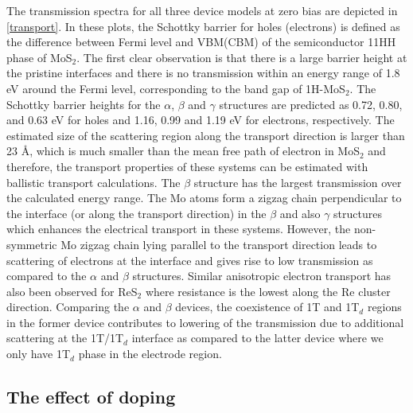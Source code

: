 The transmission spectra for all three  device models at zero bias are depicted in \autoref{transport}. In these plots, the Schottky barrier for holes (electrons) is defined as the difference between Fermi level and VBM(CBM) of the semiconductor 11HH phase of MoS$_2$. The first clear observation is that there is a large barrier height at the pristine interfaces and there is no transmission within an energy range of 1.8 eV around the Fermi level, corresponding to the band gap of 1H-MoS$_2$. The Schottky barrier heights for the $\alpha$, $\beta$ and $\gamma$ structures are predicted as 0.72,  0.80, and 0.63 eV for holes and 1.16, 0.99 and 1.19 eV for electrons, respectively. The estimated size of the scattering region along the transport direction is larger than 23 {\AA}, which is much smaller than the mean free path of electron in MoS$_2$\cite{mos2-trans} and therefore, the transport properties of these systems can be estimated with ballistic transport calculations. The $\beta$ structure has the largest transmission over the calculated energy range. The Mo atoms form a zigzag chain perpendicular to the interface (or along the transport direction) in the $\beta$ and also $\gamma$ structures which enhances the electrical transport in these systems. However, the non-symmetric Mo zigzag chain lying parallel  to the transport direction leads to scattering of electrons at the interface and gives rise to low transmission as compared to the $\alpha$ and $\beta$ structures. Similar anisotropic electron transport has also been  observed for ReS$_2$ where resistance is the lowest along the Re cluster direction\cite{doi:10.1021/acsnano.5b04851}. Comparing  the $\alpha$ and $\beta$ devices,  the coexistence of 1T and 1T$_d$ regions in the former device contributes to lowering of the transmission due to additional scattering at the 1T/1T$_d$ interface as compared to the latter device where we only have 1T$_d$ phase in the electrode region.

\subsection{The effect of doping}

